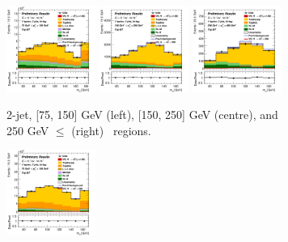 \vspace*{\fill} \newpage

\begin{figure}[h!]
    \centering
    \begin{subfigure}[b]{\textwidth}
        \centering
        \includegraphics[width=0.32\textwidth]{Images/VH/Own_fit/postfit_VHcc/Region_distmBB_BMax150_BMin75_DtopCRBC_J2_TTypebt_T1_L1_Y6051_GlobalFit_conditionnal_mu1.png}
        \includegraphics[width=0.32\textwidth]{Images/VH/Own_fit/postfit_VHcc/Region_distmBB_BMax250_BMin150_DtopCRBC_J2_TTypebt_T1_L1_Y6051_GlobalFit_conditionnal_mu1.png}
        \includegraphics[width=0.32\textwidth]{Images/VH/Own_fit/postfit_VHcc/Region_distmBB_BMax400_BMin250_DtopCRBC_J2_TTypebt_T1_L1_Y6051_GlobalFit_conditionnal_mu1.png}
        \caption{2-jet, [75, 150] GeV (left), [150, 250] GeV (centre), and 250 GeV $\leq$ (right) \ptv\ regions.}
        \label{fig:plots_VHcc_1L_TopCR_2J}
    \end{subfigure}
    \begin{subfigure}[b]{\textwidth}
        \centering
        \includegraphics[width=0.32\textwidth]{Images/VH/Own_fit/postfit_VHcc/Region_distmBB_BMax150_BMin75_DtopCRBC_J3_TTypebt_T1_L1_Y6051_GlobalFit_conditionnal_mu1.png}

\end{subfigure}
\end{figure}

